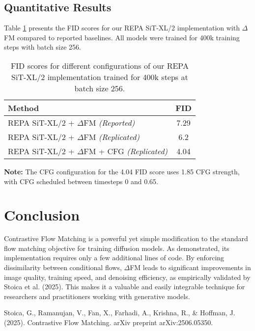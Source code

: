 \documentclass{article}
\begin{document}
\subsection{Quantitative Results}

Table \ref{tab:fid_results} presents the FID scores for our REPA SiT-XL/2 implementation with $\Delta$FM compared to reported baselines. All models were trained for 400k training steps with batch size 256.

\begin{table}[h]
\centering
\begin{tabular}{|l|c|}
\hline
\textbf{Method} & \textbf{FID} \\
\hline
REPA SiT-XL/2 + $\Delta$FM \textit{(Reported)} & 7.29 \\
REPA SiT-XL/2 + $\Delta$FM \textit{(Replicated)} & 6.2 \\
REPA SiT-XL/2 + $\Delta$FM + CFG \textit{(Replicated)} & 4.04 \\
\hline
\end{tabular}
\caption{FID scores for different configurations of our REPA SiT-XL/2 implementation trained for 400k steps at batch size 256.}
\label{tab:fid_results}
\end{table}

\textbf{Note:} The CFG configuration for the 4.04 FID score uses 1.85 CFG strength, with CFG scheduled between timesteps 0 and 0.65.

\section{Conclusion}

Contrastive Flow Matching is a powerful yet simple modification to the standard flow matching objective for training diffusion models. As demonstrated, its implementation requires only a few additional lines of code. By enforcing dissimilarity between conditional flows, $\Delta$FM leads to significant improvements in image quality, training speed, and denoising efficiency, as empirically validated by Stoica et al. (2025). This makes it a valuable and easily integrable technique for researchers and practitioners working with generative models.

\begin{thebibliography}{99}

Stoica, G., Ramanujan, V., Fan, X., Farhadi, A., Krishna, R., \& Hoffman, J. (2025). Contrastive Flow Matching. arXiv preprint arXiv:2506.05350.

\end{thebibliography}
\end{document}
